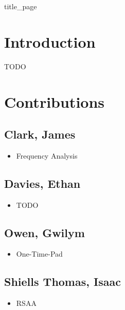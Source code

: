 \documentclass[11pt]{article}
\begin{document}
\raggedcolumns

{title_page}


\begin{multicols}{2}
	\begin{spacing}{1.125}
		\tableofcontents

		\section{Introduction}
		TODO





		\section{Contributions}
		\subsection{Clark, James}
		\begin{itemize}
			\item Frequency Analysis
		\end{itemize}
		\subsection{Davies, Ethan}
		\begin{itemize}
			\item TODO
		\end{itemize}
		\subsection{Owen, Gwilym}
		\begin{itemize}
			\item One-Time-Pad
		\end{itemize}
		\subsection{Shiells Thomas, Isaac}
		\begin{itemize}
			\item RSAA
		\end{itemize}

		\printbibliography

	\end{spacing}
\end{multicols}
\end{document}
